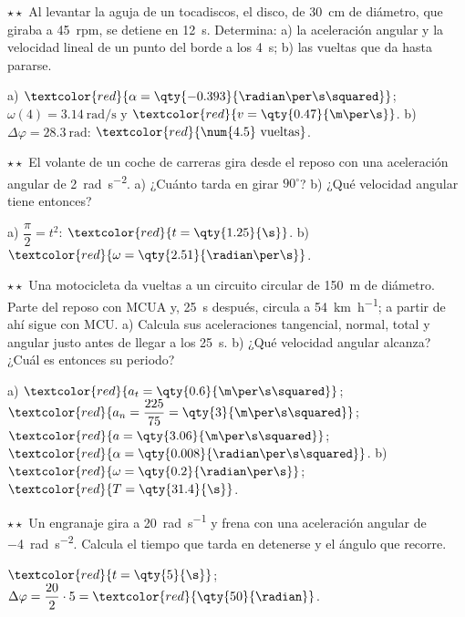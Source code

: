 \begin{exercise}
    \(\star\star\) Al levantar la aguja de un tocadiscos, el disco, de \qty{30}{\cm} de diámetro, que giraba a \qty{45}{rpm}, se
    detiene en \qty{12}{\s}. Determina: a) la aceleración angular y la velocidad lineal de un punto del borde a los \qty{4}{\s};
    b) las vueltas que da hasta pararse.
    \begin{solu}
        a) \(\textcolor{red}{\alpha = \qty{-0.393}{\radian\per\s\squared}}\); \(\omega(4) = \qty{3.14}{\radian\per\s}\) y
        \(\textcolor{red}{v = \qty{0.47}{\m\per\s}}\). b) \(\Delta\varphi = \qty{28.3}{\radian}\): \(\textcolor{red}{\num{4.5}~\text{vueltas}}\).
    \end{solu}
\end{exercise}

\begin{exercise}
    \(\star\star\) El volante de un coche de carreras gira desde el reposo con una aceleración angular de \qty{2}{\radian\per\s\squared}.
    a) ¿Cuánto tarda en girar \(90^\circ\)? b) ¿Qué velocidad angular tiene entonces?
    \begin{solu}
        a) \(\dfrac{\pi}{2} = t^2\): \(\textcolor{red}{t = \qty{1.25}{\s}}\). b) \(\textcolor{red}{\omega = \qty{2.51}{\radian\per\s}}\).
    \end{solu}
\end{exercise}

\begin{exercise}
    \(\star\star\) Una motocicleta da vueltas a un circuito circular de \qty{150}{\m} de diámetro. Parte del reposo con MCUA y,
    \qty{25}{\s} después, circula a \qty{54}{\km\per\hour}; a partir de ahí sigue con MCU. a) Calcula sus aceleraciones tangencial,
    normal, total y angular justo antes de llegar a los \qty{25}{\s}. b) ¿Qué velocidad angular alcanza? ¿Cuál es entonces su
    periodo?
    \begin{solu}
        a) \(\textcolor{red}{a_t = \qty{0.6}{\m\per\s\squared}}\); \(\textcolor{red}{a_n = \dfrac{225}{75} = \qty{3}{\m\per\s\squared}}\);
        \(\textcolor{red}{a = \qty{3.06}{\m\per\s\squared}}\); \(\textcolor{red}{\alpha = \qty{0.008}{\radian\per\s\squared}}\).
        b) \(\textcolor{red}{\omega = \qty{0.2}{\radian\per\s}}\); \(\textcolor{red}{T = \qty{31.4}{\s}}\).
    \end{solu}
\end{exercise}

\begin{exercise}
    \(\star\star\) Un engranaje gira a \qty{20}{\radian\per\s} y frena con una aceleración angular de \qty{-4}{\radian\per\s\squared}.
    Calcula el tiempo que tarda en detenerse y el ángulo que recorre.
    \begin{solu}
        \(\textcolor{red}{t = \qty{5}{\s}}\); \(\Delta\varphi = \dfrac{20}{2} \cdot 5 = \textcolor{red}{\qty{50}{\radian}}\).
    \end{solu}
\end{exercise}

